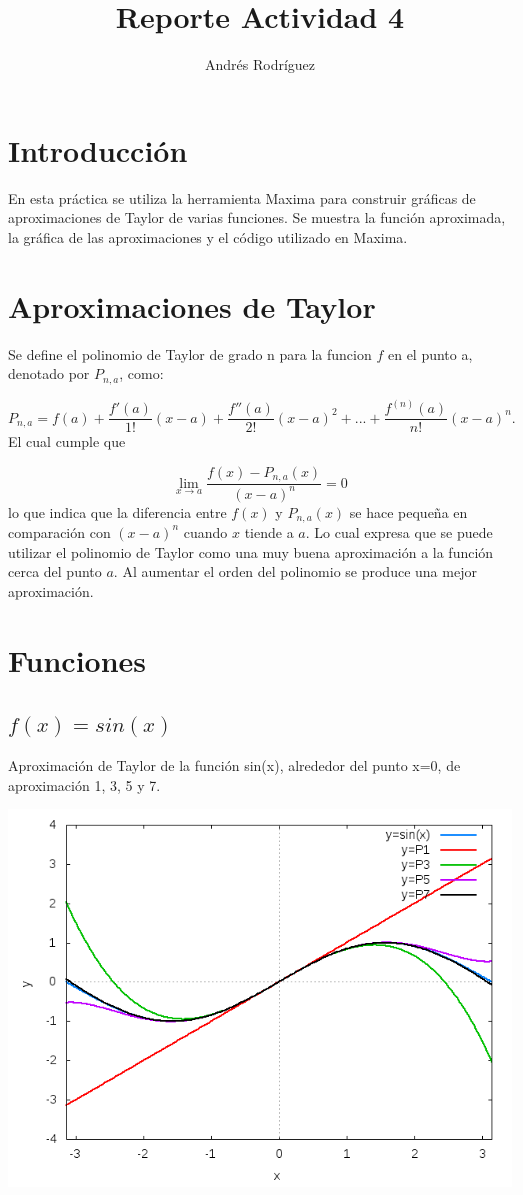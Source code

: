 \documentclass{article}
\title{Reporte Actividad 4}
\author{Andr\'es Rodr\'iguez}
\date{}
\begin{document}
\maketitle

\graphicspath{ {Graphs/} }


\section{Introducci\'on}

En esta pr\'actica se utiliza la herramienta Maxima para construir gr\'aficas de aproximaciones de Taylor de varias funciones. Se muestra la funci\'on aproximada, la gr\'afica de las aproximaciones y el c\'odigo utilizado en Maxima.

\section{Aproximaciones de Taylor}
Se define el polinomio de Taylor de grado n para la funcion $f$ en el punto a, denotado por $P_{n,a}$, como:

$$P_{n,a} = f(a) + \frac{f'(a)}{1!}(x-a) + \frac{f''(a)}{2!}(x-a)^2 + ... + \frac{f^{(n)}(a)}{n!}(x-a)^n. $$
El cual cumple que

$$\lim_{x\to a} \frac{f(x)-P_{n,a}(x)}{(x-a)^n}=0$$
lo que indica que la diferencia entre $f(x)$ y $P_{n,a}(x)$ se hace peque\~na en comparaci\'on con $(x-a)^n$ cuando $x$ tiende a $a$. Lo cual expresa que se puede utilizar el polinomio de Taylor como una muy buena aproximaci\'on a la funci\'on cerca del punto $a$. Al aumentar el orden del polinomio se produce una mejor aproximaci\'on.
\section{Funciones}



\subsection{$f(x)= sin(x)$}
Aproximaci\'on de Taylor de la funci\'on sin(x), alrededor del punto  x=0, de aproximaci\'on 1, 3, 5 y 7.

\includegraphics[scale=.5]{sin}
\end{document}
